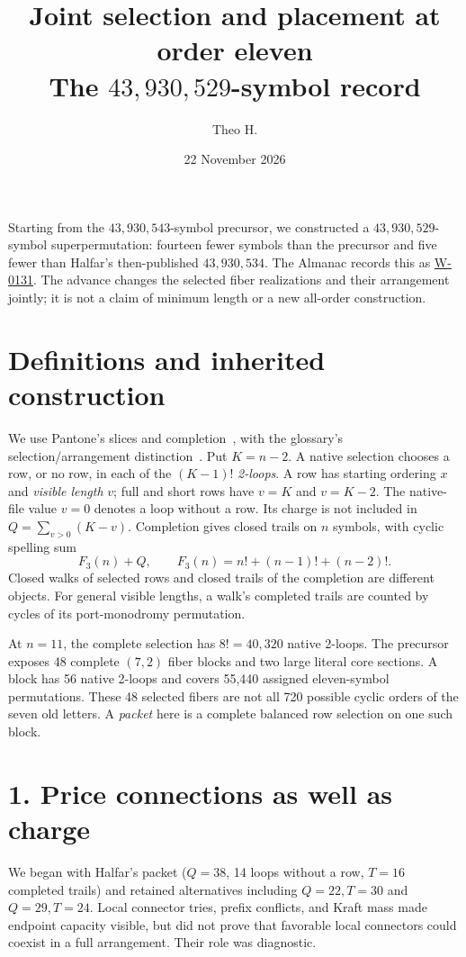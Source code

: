 \documentclass[11pt]{article}
\title{\vspace{-1.5em}Joint selection and placement at order eleven\\
\large The $43{,}930{,}529$-symbol record}
\author{Theo H.}
\date{22 November 2026}
\begin{document}
\maketitle
\vspace{-1.5em}
Starting from the $43{,}930{,}543$-symbol precursor, we constructed a
$43{,}930{,}529$-symbol superpermutation: fourteen fewer symbols than the
precursor and five fewer than Halfar's then-published $43{,}930{,}534$.
The Almanac records this as \href{https://superpermutations.com/w/W-0131}{W-0131}.
The advance changes the selected fiber realizations and their arrangement
jointly; it is not a claim of minimum length or a new all-order construction.

\section*{Definitions and inherited construction}
We use Pantone's slices and completion~\cite{pantone}, with the glossary's
selection/arrangement distinction~\cite{glossary}. Put $K=n-2$.
A native selection chooses a row, or no row, in each of the $(K-1)!$
\emph{2-loops}. A row has starting ordering $x$ and \emph{visible length}
$v$; full and short rows have $v=K$ and $v=K-2$. The native-file value
$v=0$ denotes a loop without a row. Its charge is not included in
$Q=\sum_{v>0}(K-v)$.
Completion gives closed trails on $n$ symbols, with cyclic spelling sum
\[
F_3(n)+Q,\qquad F_3(n)=n!+(n-1)!+(n-2)!.
\]
Closed walks of selected rows and closed trails of the completion are
different objects. For general visible lengths, a walk's completed trails
are counted by cycles of its port-monodromy permutation.

At $n=11$, the complete selection has $8!=40{,}320$ native 2-loops.
The precursor exposes 48 complete $(7,2)$ fiber blocks and two large
literal core sections. A block has 56 native 2-loops and covers 55,440
assigned eleven-symbol permutations. These 48 selected fibers are not all
720 possible cyclic orders of the seven old letters.
A \emph{packet} here is a complete balanced row selection on one such block.

\section*{1. Price connections as well as charge}
We began with Halfar's packet ($Q=38$, 14 loops without a row, $T=16$
completed trails) and retained alternatives including $Q=22,T=30$ and
$Q=29,T=24$. Local connector tries, prefix conflicts, and Kraft mass
made endpoint capacity visible, but did not prove that favorable local
connectors could coexist in a full arrangement. Their role was diagnostic.
\end{document}
